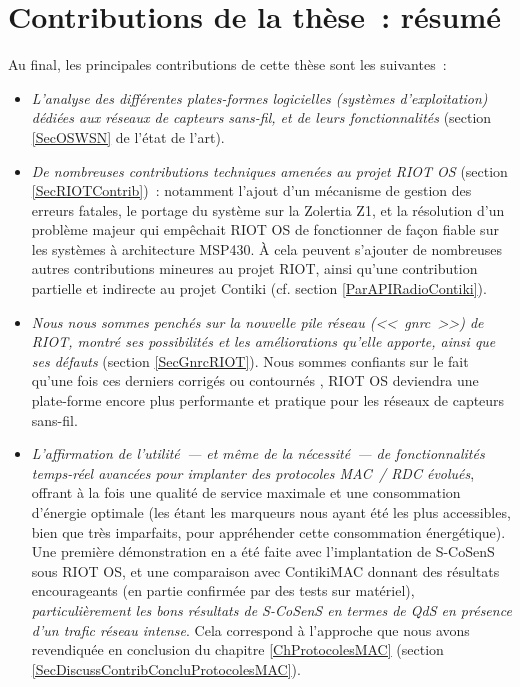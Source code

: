 
\section{Contributions de la thèse~: résumé}

Au final, les principales contributions de cette thèse sont les suivantes~:

\begin{itemize}

\item \emph{L'analyse des différentes plates-formes logicielles (systèmes
d'exploitation) dédiées aux réseaux de capteurs sans-fil, et de leurs
fonctionnalités} (section \vref{SecOSWSN} de l'état de l'art).

\item \emph{De nombreuses contributions techniques amenées au projet RIOT
OS} (section \vref{SecRIOTContrib})~: notamment l'ajout d'un mécanisme de
gestion des erreurs fatales, le portage du système sur la 
Zolertia Z1, et la résolution d'un problème majeur qui empêchait RIOT OS
de fonctionner de façon fiable sur les systèmes à architecture MSP430.
À cela peuvent s'ajouter de nombreuses autres contributions mineures
au projet RIOT, ainsi qu'une contribution partielle et indirecte au projet
Contiki (cf. section \vref{ParAPIRadioContiki}).

\item \emph{Nous nous sommes penchés sur la nouvelle pile réseau (<<~gnrc~>>)
de RIOT, montré ses possibilités et les améliorations qu'elle apporte,
ainsi que ses défauts} (section \vref{SecGnrcRIOT}). Nous sommes confiants
sur le fait qu'une fois ces derniers corrigés ou contournés \footnotemark[1],
RIOT OS deviendra une plate-forme encore plus performante et pratique
pour les réseaux de capteurs sans-fil.


\item \emph{L'affirmation de l'utilité~--- et même de la nécessité~---
de fonctionnalités temps-réel avancées pour implanter des protocoles
MAC~/ RDC évolués}, offrant à la fois une qualité de service maximale
et une consommation d'énergie optimale (les 
étant les marqueurs nous ayant été les plus accessibles, bien que très
imparfaits, pour appréhender cette consommation énergétique).
Une première démonstration en a été faite avec l'implantation de
S-CoSenS sous RIOT OS, et une comparaison avec ContikiMAC donnant des
résultats encourageants (en partie confirmée par des tests sur matériel),
\emph{particulièrement les bons résultats de S-CoSenS en termes de QdS
en présence d'un trafic réseau intense}. Cela correspond à l'approche
que nous avons revendiquée en conclusion du chapitre \ref{ChProtocolesMAC}
(section \vref{SecDiscussContribConcluProtocolesMAC}).


\end{itemize}
